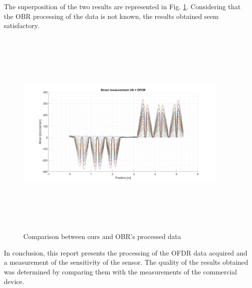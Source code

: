 The superposition of the two results are represented in Fig. \ref{fig:sovrapposizione}. Considering that the OBR processing of the data is not known, the results obtained seem satisfactory.
\begin{figure}[H]
	\centering
	\includegraphics[height=10.5cm, width=10.5cm, keepaspectratio]{img/sovrapposizione.png}
	\caption{Comparison between ours and OBR's processed data }\label{fig:sovrapposizione}
\end{figure}



In conclusion, this report presents the processing of the OFDR data acquired and a measurement of the sensitivity of the sensor. The quality of the results obtained was determined by comparing them with the measurements of the commercial device.



